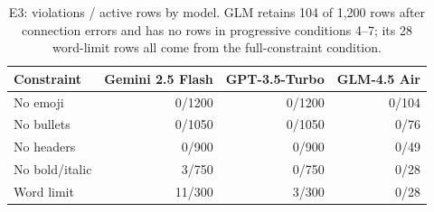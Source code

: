 \begin{table}[t]
\centering

\caption{E3: violations / active rows by model. GLM retains 104 of 1,200 rows after connection errors and has no rows in progressive conditions 4--7; its 28 word-limit rows all come from the full-constraint condition.}
\label{tab:study3-model}
\begin{tabular}{lrrr}
\toprule
Constraint & Gemini 2.5 Flash & GPT-3.5-Turbo & GLM-4.5 Air \\
\midrule
No emoji & 0/1200 & 0/1200 & 0/104 \\
No bullets & 0/1050 & 0/1050 & 0/76 \\
No headers & 0/900 & 0/900 & 0/49 \\
No bold/italic & 3/750 & 0/750 & 0/28 \\
Word limit & 11/300 & 3/300 & 0/28 \\
\bottomrule
\end{tabular}
\end{table}
